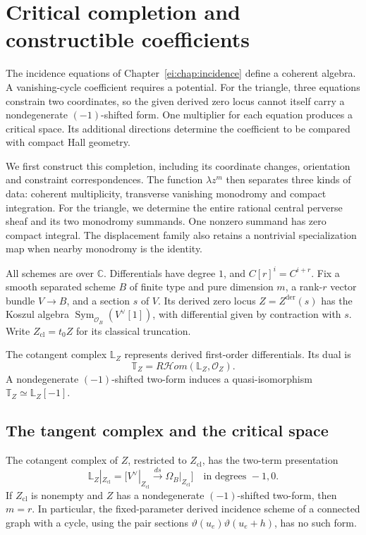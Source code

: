 \chapter{Critical completion and constructible coefficients}
\label{vc:chap:critical}

The incidence equations of Chapter~\ref{ei:chap:incidence}
define a coherent algebra. A vanishing-cycle coefficient
requires a potential. For the triangle, three equations
constrain two coordinates, so the given derived zero locus
cannot itself carry a nondegenerate $(-1)$-shifted form.
One multiplier for each equation produces a critical space.
Its additional directions determine the coefficient to be
compared with compact Hall geometry.

We first construct this completion, including its coordinate
changes, orientation and constraint correspondences.
The function $\lambda z^m$ then separates three kinds of
data: coherent multiplicity, transverse vanishing monodromy
and compact integration. For the triangle, we determine
the entire rational central perverse sheaf and its two
monodromy summands. One nonzero summand has zero compact
integral. The displacement family also retains a nontrivial
specialization map when nearby monodromy is the identity.

All schemes are over $\mathbb C$. Differentials have degree $1$,
and $C[r]^i=C^{i+r}$. Fix a smooth separated scheme $B$
of finite type and pure dimension $m$,
a rank-$r$ vector bundle $V\to B$, and a section $s$ of $V$.
Its derived zero locus $Z=Z^{\mathrm{der}}(s)$ has the Koszul
algebra $\operatorname{Sym}_{\mathcal O_B}(V^\vee[1])$,
with differential given by contraction with $s$.
Write $Z_{\mathrm{cl}}=t_0Z$ for its classical truncation.

The cotangent complex $\mathbb L_Z$ represents derived
first-order differentials. Its dual is
\[
 \mathbb T_Z=R\mathcal Hom(\mathbb L_Z,\mathcal O_Z).
\]
A nondegenerate $(-1)$-shifted two-form induces a
quasi-isomorphism $\mathbb T_Z\simeq\mathbb L_Z[-1]$.

\section{The tangent complex and the critical space}

\begin{proposition}\label{vc:cicp:prop:rank}
The cotangent complex of $Z$, restricted to $Z_{\mathrm{cl}}$,
has the two-term presentation
\begin{equation}\label{vc:cicp:eq:cotangent}
 \mathbb L_Z|_{Z_{\mathrm{cl}}}
   =\bigl[V^\vee|_{Z_{\mathrm{cl}}}
       \xrightarrow{\,ds\,}\Omega_B|_{Z_{\mathrm{cl}}}\bigr]
 \quad\text{in degrees }-1,0.
\end{equation}
If $Z_{\mathrm{cl}}$ is nonempty and $Z$ has a nondegenerate
$(-1)$-shifted two-form, then $m=r$.
In particular, the fixed-parameter derived incidence scheme
of a connected graph with a cycle, using the pair sections
$\vartheta(u_e)\vartheta(u_e+h)$, has no such form.
\end{proposition}

